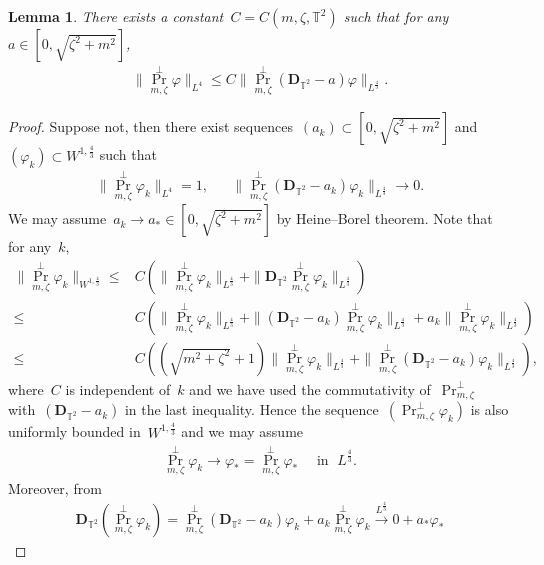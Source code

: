 \documentclass[11pt,final]{amsart}
\newcommand{\T}{\mathbb{T}}
\newcommand{\pD}{\mathbf{D}}
\newcommand{\parenthesis}[1]{\left(#1\right)} %
\DeclareMathOperator{\proj}{Pr}
\newtheorem{lemma}[thm]{Lemma}
\begin{document}
\begin{lemma}\label{lemma:invertibility-orthogonal}
    There exists a constant~$C=C(m,\zeta,\mathbb{T}^2)$ such that for any~$a\in [0,\sqrt{\zeta^2+m^2}]$, 
    \begin{align}
        \|\proj_{m,\zeta}^\perp \varphi\|_{L^4}\leq C\|\proj_{m,\zeta}^\perp(\pD_{\T^2}-a)\varphi\|_{L^{\frac{4}{3}}}.
    \end{align}
\end{lemma}

\begin{proof}
    Suppose not, then there exist sequences~$(a_k)\subset [0,\sqrt{\zeta^2+m^2}]$ and~$(\varphi_k)\subset W^{1,\frac{4}{3}}$ such that
        \begin{align}
            \|\proj_{m,\zeta}^\perp\varphi_k\|_{L^4}=1, & &
            \|\proj_{m,\zeta}^\perp(\pD_{\T^2}-a_k)\varphi_k\|_{L^{\frac{4}{3}}}\to 0.
        \end{align}
        We may assume~$a_k\to a_*\in [0,\sqrt{\zeta^2+m^2}]$ by Heine--Borel theorem. 
        Note that for any~$k$,
        \begin{align}
            \|\proj_{m,\zeta}^\perp \varphi_k \|_{W^{1,\frac{4}{3}}}
            \leq& C \parenthesis{ \| \proj_{m,\zeta}^\perp \varphi_k\|_{L^{\frac{4}{3}}} + \|\pD_{\T^2}\proj_{m,\zeta}^\perp \varphi_k\|_{L^{\frac{4}{3}}} } \\
            \leq& C \parenthesis{
            \| \proj_{m,\zeta}^\perp \varphi_k\|_{L^{\frac{4}{3}}}
            + \|(\pD_{\T^2}-a_k)\proj_{m,\zeta}^\perp \varphi_k\|_{L^{\frac{4}{3}}} 
            + a_k\|\proj_{m,\zeta}^\perp \varphi_k\|_{L^{\frac{4}{3}}} } \\
            \leq& C \parenthesis{ (\sqrt{m^2+\zeta^2}+1)\| \proj_{m,\zeta}^\perp \varphi_k\|_{L^{\frac{4}{3}}} + \|\proj_{m,\zeta}^\perp (\pD_{\T^2}-a_k)\varphi_k\|_{L^{\frac{4}{3}}} },
        \end{align}
        where~$C$ is independent of~$k$ and we have used the commutativity of~$\proj_{m,\zeta}^\perp$ with~$(\pD_{\T^2}-a_k)$ in the last inequality.
        Hence the sequence~$(\proj_{m,\zeta}^\perp \varphi_k)$ is also uniformly bounded in~$W^{1,\frac{4}{3}}$ and we may assume
        \begin{align}
            \proj_{m,\zeta}^\perp\varphi_k \to \varphi_*=\proj_{m,\zeta}^\perp \varphi_*\quad  \mbox{ in } \;  L^{\frac{4}{3}}.
        \end{align}
        Moreover, from
        \begin{align}
            \pD_{\T^2}(\proj_{m,\zeta}^\perp\varphi_k)= \proj_{m,\zeta}^\perp (\pD_{\T^2}-a_k)\varphi_k+ a_k \proj_{m,\zeta}^\perp\varphi_k \xrightarrow{L^{\frac{4}{3}}} 0+ a_*\varphi_*

\end{align}
\end{proof}
\end{document}
